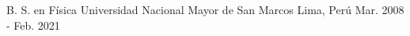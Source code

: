 

\begin{cventries}

  \cventry
    {B. S. en Física} %
    {Universidad Nacional Mayor de San Marcos} %
    {Lima, Perú} %
    {
      Mar. 2008 - Feb. 2021
    } %
    {}
\end{cventries}

